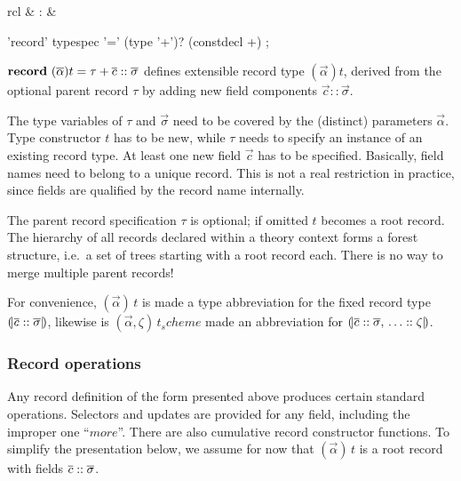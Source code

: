 \begin{matharray}{rcl}
   & : &  \\
\end{matharray}

\begin{rail}
  'record' typespec '=' (type '+')? (constdecl +)
  ;
\end{rail}

\begin{descr}
\item [${\mathord{\mathbf{record}}}~(\overline{\alpha})t = \tau + \overline{c} :: \overline{\sigma}$]
  defines extensible record type $(\vec\alpha)t$, derived from the optional
  parent record $\tau$ by adding new field components $\vec c :: \vec\sigma$.

  The type variables of $\tau$ and $\vec\sigma$ need to be covered by the
  (distinct) parameters $\vec\alpha$.  Type constructor $t$ has to be new,
  while $\tau$ needs to specify an instance of an existing record type.  At
  least one new field $\vec c$ has to be specified.  Basically, field names
  need to belong to a unique record.  This is not a real restriction in
  practice, since fields are qualified by the record name internally.

  The parent record specification $\tau$ is optional; if omitted $t$ becomes a
  root record.  The hierarchy of all records declared within a theory context
  forms a forest structure, i.e.\ a set of trees starting with a root record
  each.  There is no way to merge multiple parent records!

  For convenience, $(\vec\alpha) \, t$ is made a type abbreviation for the
  fixed record type $\mathopen{(\!|} \overline{c} \mathrel{::} \overline{\sigma} \mathclose{|\!)}$, likewise is
  $(\vec\alpha, \zeta) \, t_scheme$ made an abbreviation for $\mathopen{(\!|} \overline{c}
    \mathrel{::} \overline{\sigma}\mathpunct{,\,} \ldots \mathrel{::} \zeta \mathclose{|\!)}$.

\end{descr}

\subsubsection{Record operations}

Any record definition of the form presented above produces certain standard
operations.  Selectors and updates are provided for any field, including the
improper one ``$more$''.  There are also cumulative record constructor
functions.  To simplify the presentation below, we assume for now that
$(\vec\alpha) \, t$ is a root record with fields $\overline{c} \mathrel{::} \overline{\sigma}$.

